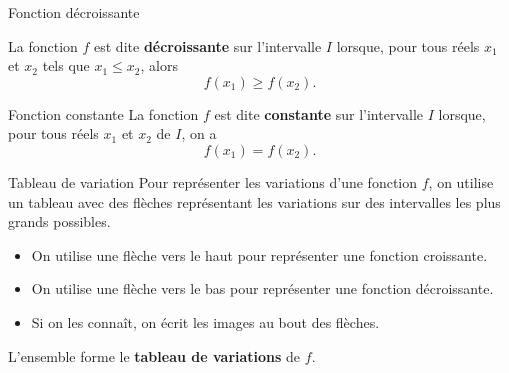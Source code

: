 \documentclass[11pt]{article}
\begin{document}
\begin{defi}{Fonction décroissante}
  \begin{minipage}{.5\textwidth}
    La fonction $f$ est dite \textbf{décroissante} sur l'intervalle $I$ lorsque,
    pour tous réels $x_1$ et $x_2$ tels que $x_1\leq x_2$, alors
    \[
      f(x_1)\geq f(x_2).
    \]
  \end{minipage}
  \begin{minipage}{.5\textwidth}
    \begin{center}
    \end{center}
  \end{minipage}
\end{defi}
\begin{defi}{Fonction constante}
  La fonction $f$ est dite \textbf{constante} sur l'intervalle $I$ lorsque, pour
  tous réels $x_1$ et $x_2$ de $I$, on a 
  \[
    f(x_1)=f(x_2).
  \]
\end{defi}

\begin{defi}{Tableau de variation}
  Pour représenter les variations d'une fonction $f$, on utilise un tableau avec
  des flèches représentant les variations sur des intervalles les plus grands
  possibles.

  \begin{itemize}
    \item On utilise une flèche vers le haut pour représenter une fonction
  croissante.
\item On utilise une flèche vers le bas pour représenter une fonction
  décroissante.
\item Si on les connaît, on écrit les images au bout des flèches.
  \end{itemize}
  L'ensemble forme le \textbf{tableau de variations} de $f$.
\end{defi}
\end{document}
